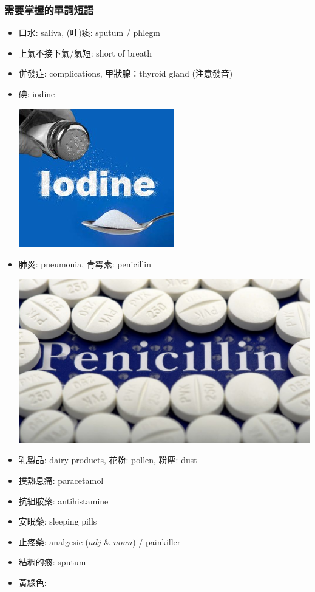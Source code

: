 \subsubsection*{需要掌握的單詞短語}
\begin{itemize}
  \itemsep0em
  \item 口水: saliva, (吐)痰:  sputum / phlegm
  \item 上氣不接下氣/氣短: short of breath
  \item 併發症: complications, 甲狀腺：thyroid gland (注意發音)
  \item 碘: iodine
  \begin{center}
    \includegraphics[scale=.7]{pics/iodine}
  \end{center}
  \item 肺炎: pneumonia, 青霉素: penicillin
  \begin{center}
    \includegraphics[scale=.3]{pics/penicillin}
  \end{center}
  \item 乳製品: dairy products, 花粉: pollen, 粉塵: dust
  \item 撲熱息痛: paracetamol
  \item 抗組胺藥: antihistamine
  \item 安眠藥: sleeping pills
  \item 止疼藥: analgesic ($adj$ \& $noun$) / painkiller
  \item 粘稠的痰:  sputum
  \item 黃綠色: 
\end{itemize}

